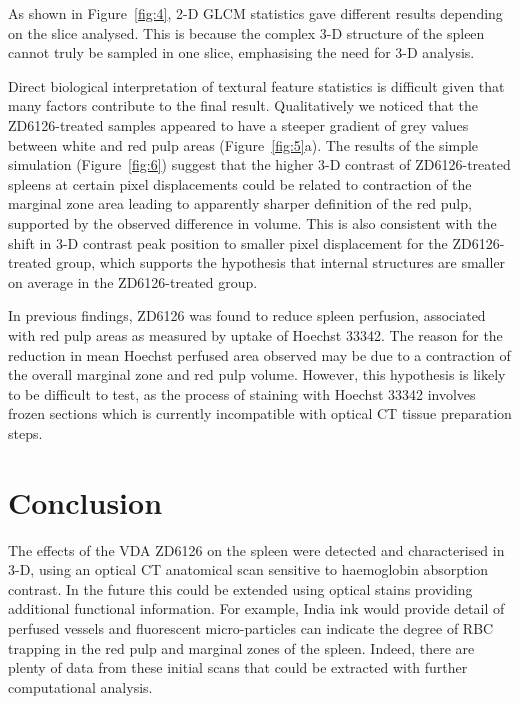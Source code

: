 	As shown in Figure~\ref{fig:4}, 2-D GLCM statistics gave different results depending on the slice analysed. This is because the complex 3-D structure of the spleen cannot truly be sampled in one slice, emphasising the need for 3-D analysis. 
	
	Direct biological interpretation of textural feature statistics is difficult given that many factors contribute to the final result. Qualitatively we noticed that the ZD6126-treated samples appeared to have a steeper gradient of grey values between white and red pulp areas (Figure~\ref{fig:5}a). The results of the simple simulation (Figure~\ref{fig:6}) suggest that the higher 3-D contrast of ZD6126-treated spleens at certain pixel displacements could be related to contraction of the marginal zone area leading to apparently sharper definition of the red pulp, supported by the observed difference in volume. This is also consistent with the shift in 3-D contrast peak position to smaller pixel displacement for the ZD6126-treated group, which supports the hypothesis that internal structures are smaller on average in the ZD6126-treated group.
	
	In previous findings, ZD6126 was found to reduce spleen perfusion, associated with red pulp areas as measured by uptake of Hoechst 33342. \cite{cullistumour2006} The reason for the reduction in mean Hoechst perfused area observed may be due to a contraction of the overall marginal zone and red pulp volume. However, this hypothesis is likely to be difficult to test, as the process of staining with Hoechst 33342 involves frozen sections which is currently incompatible with optical CT tissue preparation steps. 
	
	\section{Conclusion} 
	The effects of the VDA ZD6126 on the spleen were detected and characterised in 3-D, using an optical CT anatomical scan sensitive to haemoglobin absorption contrast. In the future this could be extended using optical stains providing additional functional information. For example, India ink would provide detail of perfused vessels and fluorescent micro-particles can indicate the degree of RBC trapping in the red pulp and marginal zones of the spleen. Indeed, there are plenty of data from these initial scans that could be extracted with further computational analysis.
	
